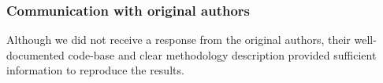 \subsubsection*{Communication with original authors}


Although we did not receive a response from the original authors, their well-documented code-base and clear methodology description provided sufficient information to reproduce the results.
